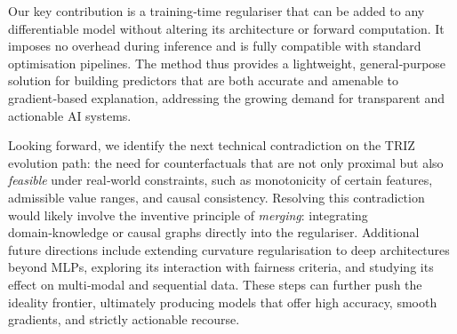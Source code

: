 \documentclass[11pt,a4paper]{article}
\begin{document}
Our key contribution is a training‑time regulariser that can be added to any differentiable model without altering its architecture or forward computation. It imposes no overhead during inference and is fully compatible with standard optimisation pipelines. The method thus provides a lightweight, general‑purpose solution for building predictors that are both accurate and amenable to gradient‑based explanation, addressing the growing demand for transparent and actionable AI systems.

Looking forward, we identify the next technical contradiction on the TRIZ evolution path: the need for counterfactuals that are not only proximal but also \emph{feasible} under real‑world constraints, such as monotonicity of certain features, admissible value ranges, and causal consistency. Resolving this contradiction would likely involve the inventive principle of \emph{merging}: integrating domain‑knowledge or causal graphs directly into the regulariser. Additional future directions include extending curvature regularisation to deep architectures beyond MLPs, exploring its interaction with fairness criteria, and studying its effect on multi‑modal and sequential data. These steps can further push the ideality frontier, ultimately producing models that offer high accuracy, smooth gradients, and strictly actionable recourse.

\nocite{*}


\end{document}
